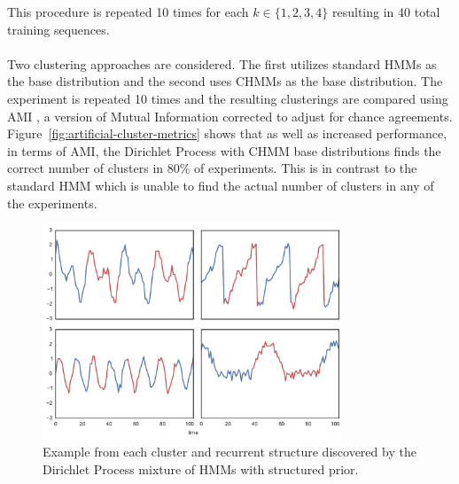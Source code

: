 \documentclass[12pt]{report}
\newcommand{\1}[0]{\mathbbm{1}}
\begin{document}
This procedure is repeated 10 times for each $k \in \{1,2,3,4\}$ resulting in 40
total training sequences.
\\\\
Two clustering approaches are considered. The first utilizes standard \acp{HMM}
as the base distribution and the second uses \acp{CHMM} as the base distribution.
The experiment is repeated 10 times and the resulting clusterings are compared using
\ac{AMI} \cite{ami}, a version of Mutual Information corrected to adjust for chance agreements.
Figure~\ref{fig:artificial-cluster-metrics} shows that as well as increased performance,
in terms of \ac{AMI}, the Dirichlet Process with \ac{CHMM} base distributions finds
the correct number of clusters in 80\% of experiments. This is in contrast to the standard
\ac{HMM} which is unable to find the actual number of clusters in any of the experiments.

\begin{figure}[H]
    \centering
    \includegraphics[width=0.8\textwidth]{./img/artificial-clusters.pdf}
    \caption[Visulization of synthetic sequence clusters]{
        Example from each cluster and recurrent structure
        discovered by the Dirichlet Process mixture of HMMs with structured prior.
    }
    \label{fig:artificial-clusters}
\end{figure}
\end{document}
